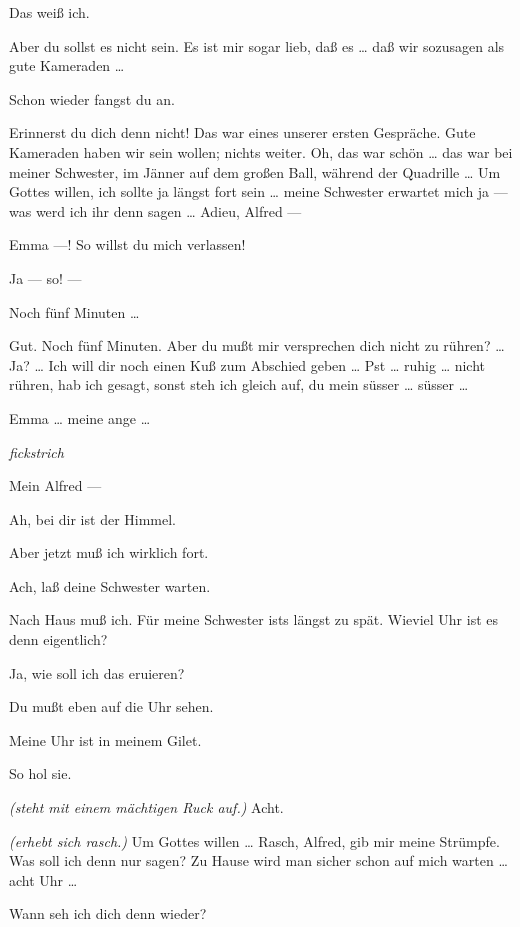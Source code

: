 \documentclass[
	final,
	a4paper,
	ngerman,
	mpinclude = true, %
	twoside = true,
	open = right,
	cleardoublepage = plain,
	DIV = 13,
	BCOR = 1cm,
	titlepage = firstiscover,
	]{scrbook}
\newcommand{\direction}[1]{\textit{(#1)}}
\newcommand{\hiat}{%
	\begin{center}
		\tiny
		\raisebox{0.5ex}{\rule{0.3\linewidth}{0.4pt}}
		\textit{fickstrich}
		\raisebox{0.5ex}{\rule{0.3\linewidth}{0.4pt}}
	\end{center}
}
\newcommand{\thecharacter}[1]{\textup{\textsc{#1}}\xspace}
\newcommand{\theherr}{\thecharacter{Junger Herr}}
\newcommand{\thefrau}{\thecharacter{Junge Frau}}
\newcommand{\character}[1]{\item[#1:]}
\newcommand{\herr}{\character{\theherr}}
\newcommand{\frau}{\character{\thefrau}}
\begin{document}
\begin{play}
	\herr
	Das weiß ich.

	\frau
	Aber du sollst es nicht sein. Es ist mir sogar lieb, daß es \ldots{} daß wir sozusagen als gute Kameraden \ldots{}

	\herr
	Schon wieder fangst du an.

	\frau
	Erinnerst du dich denn nicht! Das war eines unserer ersten Gespräche. Gute Kameraden haben wir sein wollen; nichts weiter. Oh, das war schön \ldots{} das war bei meiner Schwester, im Jänner auf dem großen Ball, während der Quadrille \ldots{} Um Gottes willen, ich sollte ja längst fort sein \ldots{} meine Schwester erwartet mich ja --- was werd ich ihr denn sagen \ldots{} Adieu, Alfred ---

	\herr
	Emma ---! So willst du mich verlassen!

	\frau
	Ja --- so! ---

	\herr
	Noch fünf Minuten \ldots{}

	\frau
	Gut. Noch fünf Minuten. Aber du mußt mir versprechen dich nicht zu rühren? \ldots{} Ja? \ldots{} Ich will dir noch einen Kuß zum Abschied geben \ldots{} Pst \ldots{} ruhig \ldots{} nicht rühren, hab ich gesagt, sonst steh ich gleich auf, du mein süsser \ldots{} süsser \ldots{}

	\herr
	Emma \ldots{} meine ange \ldots{}

	\hiat

	\frau
	Mein Alfred ---

	\herr
	Ah, bei dir ist der Himmel.

	\frau
	Aber jetzt muß ich wirklich fort.

	\herr
	Ach, laß deine Schwester warten.

	\frau
	Nach Haus muß ich. Für meine Schwester ists längst zu spät. Wieviel Uhr ist es denn eigentlich?

	\herr
	Ja, wie soll ich das eruieren?

	\frau
	Du mußt eben auf die Uhr sehen.

	\herr
	Meine Uhr ist in meinem Gilet.

	\frau
	So hol sie.

	\herr
	\direction{steht mit einem mächtigen Ruck auf.} Acht.

	\frau
	\direction{erhebt sich rasch.} Um Gottes willen \ldots{} Rasch, Alfred, gib mir meine Strümpfe. Was soll ich denn nur sagen? Zu Hause wird man sicher schon auf mich warten \ldots{} acht Uhr \ldots{}

	\herr
	Wann seh ich dich denn wieder?


\end{play}
\end{document}
